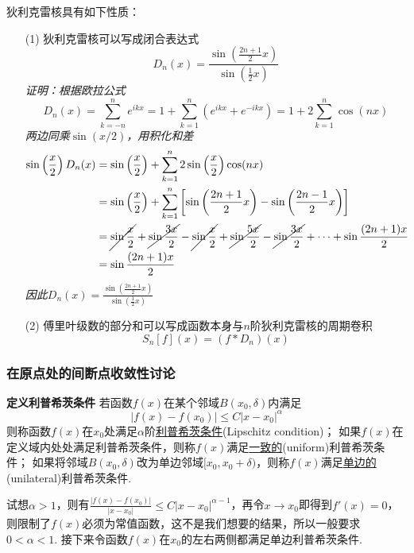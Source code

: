 \documentclass[UTF8]{ctexart}
\newenvironment{definition}[1]
    {\begin{tcolorbox}[enhanced, colback=LightYellow, breakable=false, frame hidden, borderline west={1.5mm}{-2mm}{DarkGreen}]
    {\bfseries {\color{DarkGreen} 定义}\quad #1} \newline}
    {\end{tcolorbox}}
\begin{document}
狄利克雷核具有如下性质：
\begin{itemize}
    \item [(1)] 狄利克雷核可以写成闭合表达式
    \[D_n(x)=\frac{\sin\left(\frac{2n+1}{2}x\right)}{\sin\left(\frac{1}{2}x\right)}\]
    \textit{
        证明：根据欧拉公式
        \[D_n(x) = \sum_{k=-n}^{n}e^{ikx} = 1+\sum_{k=1}^{n}(e^{ikx}+e^{-ikx}) = 1+2\sum_{k=1}^{n}\cos(nx)\]
        两边同乘\(\sin(x/2)\)，用积化和差
        \begin{align*}
            \sin\left(\frac{x}{2}\right)D_n(x) &= \sin\left(\frac{x}{2}\right)+\sum_{k=1}^{n}2\sin\left(\frac{x}{2}\right)\cos(nx) \\
            &= \sin\left(\frac{x}{2}\right)+\sum_{k=1}^{n}\left[\sin\left(\frac{2n+1}{2}x\right)-\sin\left(\frac{2n-1}{2}x\right)\right] \\
            &= \cancel{\sin\frac{x}{2}}+\cancel{\sin\frac{3x}{2}}-\cancel{\sin\frac{x}{2}}+\cancel{\sin\frac{5x}{2}}-\cancel{\sin\frac{3x}{2}}+\cdots+\sin\frac{(2n+1)x}{2} \\
            &= \sin\frac{(2n+1)x}{2}
        \end{align*}
        因此\(\displaystyle{D_n(x)=\frac{\sin\left(\frac{2n+1}{2}x\right)}{\sin\left(\frac{1}{2}x\right)}}\)
    }
    \item [(2)] 傅里叶级数的部分和可以写成函数本身与\(n\)阶狄利克雷核的周期卷积
    \[S_n[f](x) = (f*D_n)(x)\]
\end{itemize}

\subsubsection{在原点处的间断点收敛性讨论}

\begin{definition}{利普希茨条件}
    若函数\(f(x)\)在某个邻域\(B(x_0,\delta)\)内满足
    \[|f(x)-f(x_0)| \leq C|x-x_0|^\alpha\]
    则称函数\(f(x)\)在\(x_0\)处满足\(\alpha\)阶\uline{利普希茨条件}(Lipschitz condition)；
    \newline
    如果\(f(x)\)在定义域内处处满足利普希茨条件，则称\(f(x)\)满足\uline{一致的}(uniform)利普希茨条件；
    \newline
    如果将邻域\(B(x_0,\delta)\)改为单边邻域\([x_0,x_0+\delta)\)，则称\(f(x)\)满足\uline{单边的}(unilateral)利普希茨条件.
\end{definition}

试想\(\alpha>1\)，则有\(\displaystyle{\frac{|f(x)-f(x_0)|}{|x-x_0|} \leq C|x-x_0|^{\alpha-1}}\)，再令\(x\to x_0\)即得到\(f'(x)=0\)，则限制了\(f(x)\)必须为常值函数，这不是我们想要的结果，所以一般要求\(0<\alpha<1\). 接下来令函数\(f(x)\)在\(x_0\)的左右两侧都满足单边利普希茨条件.
\end{document}
